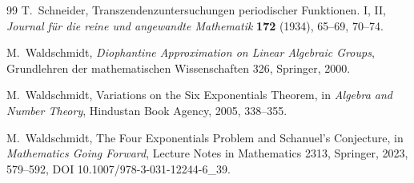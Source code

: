 \documentclass[11pt,oneside]{article}
\theoremstyle{definition}
\theoremstyle{remark}
\begin{document}
\begin{thebibliography}{99}
T.~Schneider,
\newblock Transzendenzuntersuchungen periodischer Funktionen. I, II,
\newblock \emph{Journal f\"ur die reine und angewandte Mathematik} \textbf{172} (1934), 65--69, 70--74.

M.~Waldschmidt,
\newblock \emph{Diophantine Approximation on Linear Algebraic Groups},
\newblock Grundlehren der mathematischen Wissenschaften 326, Springer, 2000.

M.~Waldschmidt,
\newblock Variations on the Six Exponentials Theorem,
\newblock in \emph{Algebra and Number Theory}, Hindustan Book Agency, 2005, 338--355.

M.~Waldschmidt,
\newblock The Four Exponentials Problem and Schanuel's Conjecture,
\newblock in \emph{Mathematics Going Forward}, Lecture Notes in Mathematics 2313, Springer, 2023, 579--592,
DOI 10.1007/978-3-031-12244-6\_39.

\end{thebibliography}
\end{document}
